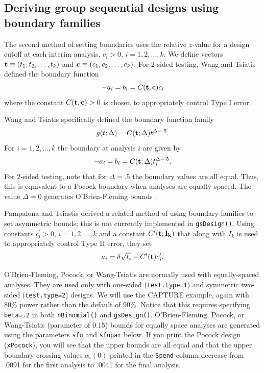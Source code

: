 \subsection{Deriving group sequential designs using boundary families  \label{sec:boundfam}}
The second method of setting boundaries uses the relative $z$-value for a design cutoff at each interim analysis, $c_i>0$, $i=1,2,\ldots,k$.
We define vectors ${\bf t}\equiv (t_1,t_2,\ldots,t_k)$ and ${\bf c}\equiv (c_1,c_2,\ldots,c_k)$.
For 2-sided testing, Wang and Tsiatis \cite{WangTsiatis} defined the boundary function 
\begin{equation}
-a_i=b_i=C({\bf t},{\bf c})c_i
\end{equation}
where the constant $C({\bf t},{\bf c})>0$ is chosen to appropriately control Type I error. 

Wang and Tsiatis \cite{WangTsiatis} specifically defined the boundary function family
\begin{equation}
g(t;\Delta)=C({\bf t}; \Delta)t^{\Delta-.5}.
\end{equation}
For $i=1,2,\ldots,k$ the boundary at analysis $i$ are given by
\[
-a_i=b_i=C({\bf t}; \Delta)t_i^{\Delta-.5}.
\]
For 2-sided testing, note that for $\Delta=.5$ the boundary values are all equal. Thus, this is equivalent to a Pocock \cite{PocockBound} boundary when analyses are equally spaced.
The value $\Delta=0$ generates O'Brien-Fleming bounds \cite{OF}. 

Pampalona and Tsiastis \cite{PampallonaTsiatis} derived a related method of using boundary families to set asymmetric bounds; this is not currently implemented in \texttt{gsDesign()}. 
Using constants $c^\prime_i>0$, $i=1,2,\ldots,k$ and a constant $C^\prime(\bf t; I_k)$ that along with $I_k$ is used to appropriately control Type II error, they set
\begin{equation}
a_i=\delta\sqrt{t_i}-C^\prime({\bf t})c_i^\prime.
\end{equation}

O'Brien-Fleming, Pocock, or Wang-Tsiatis are normally used with equally-spaced
analyses. 
They are used only with one-sided (\texttt{test.type=1}) and symmetric two-sided (\texttt{test.type=2}) designs.
We will use the CAPTURE example, again with 80\% power rather than the default of 90\%. 
Notice that this requires specifying \texttt{beta=.2} in both \texttt{nBinomial()} and \texttt{gsDesign()}.
O'Brien-Fleming, Pocock, or Wang-Tsiatis (parameter of 0.15) bounds for equally space analyses are generated using the parameters \texttt{sfu} and \texttt{sfupar} below. If you print the Pocock design (\texttt{xPocock}), you will see that the upper bounds are all equal and that the upper boundary crossing values  $\alpha_i(0)$ printed in the \texttt{Spend} column decrease from .0091 for the first analysis to .0041 for the final analysis.

